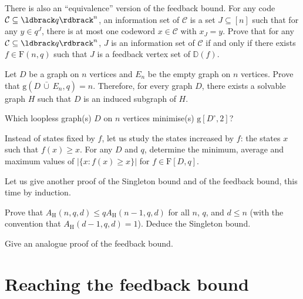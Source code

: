 \documentclass[a4paper, 11pt]{book}
\numberwithin{equation}{section}
\theoremstyle{plain}
\newcommand{\loopfull}[1]{{#1^\circ}}
\newcommand{\bcup}{\,\bar{\cup}\,}
\newcommand{\IG}{\mathbb{D}}
\newcommand{\functions}{\mathrm{F}}
\newcommand{\guessing}{\mathrm{g}}
\newcommand{\AH}{A_\mathrm{H}}
\renewcommand{\(}{\ldbrack}
\renewcommand{\)}{\rdbrack}
\begin{document}
\begin{exercises}
\item There is also an ``equivalence'' version of the feedback bound. For any code $\mathcal{C} \subseteq \(q\)^n$, an information set of $\mathcal{C}$ is a set $J \subseteq [n]$ such that for any $y \in q^J$, there is at most one codeword $x \in \mathcal{C}$ with $x_J = y$.  Prove that for any $\mathcal{C} \subseteq \(q\)^n$, $J$ is an information set of $\mathcal{C}$ if and only if there exists $f \in \functions(n,q)$ such that $J$ is a feedback vertex set of $\IG(f)$.

\item \label{exerc:solvability_is_not_local} Let $D$ be a graph on $n$ vertices and $E_n$ be the empty graph on $n$ vertices. Prove that $\guessing(D \bcup E_n, q) = n$. Therefore, for every graph $D$, there exists a solvable graph $H$ such that $D$ is an induced subgraph of $H$.

\item Which loopless graph(s) $D$ on $n$ vertices minimise(s) $\guessing[\loopfull{D}, 2]$?

\item Instead of states fixed by $f$, let us study the states increased by $f$: the states $x$ such that $f(x) \ge x$. For any $D$ and $q$, determine
the minimum, average and maximum values of $|\{ x : f(x) \ge x \}|$ for $f \in \functions[D, q]$.

\item \label{exerc:Singleton_induction1} Let us give another proof of the Singleton bound and of the feedback bound, this time by induction.
\begin{exercises}
	\item Prove that $\AH(n,q,d) \le q \AH(n-1, q, d)$ for all $n$, $q$, and $d \le n$ (with the convention that $\AH(d-1, q, d) = 1$). Deduce the Singleton bound.
	
	\item Give an analogue proof of the feedback bound.
\end{exercises}

\end{exercises}



















\chapter{Reaching the feedback bound} \label{ch:optimality_feedback}
\end{document}
